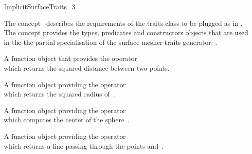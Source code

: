 

\begin{ccRefConcept}{ImplicitSurfaceTraits_3}

\ccDefinition
  
The concept \ccRefName\  describes the requirements of the traits class to
be plugged  as  in .
The concept provides the types, predicates and constructors objects
that are  used in the 
the partial specialisation  of 
the  surface mesher traits generator:
.




\ccTypes

\ccGlue
{}
\ccGlue
{}
\ccGlue
{}
\ccGlue
{}
\ccGlue
{}
\ccGlue
{}


{A function object that provides the operator\\
 which returns the squared distance
between two points.}

{A function object providing the operator\\
 which returns the squared radius
of~.}


{A function object providing the operator\\
 which computes the center of
the sphere~.}

{A function object providing the operator\\
 which
returns a line  passing through the points  and~.}


\end{ccRefConcept}
